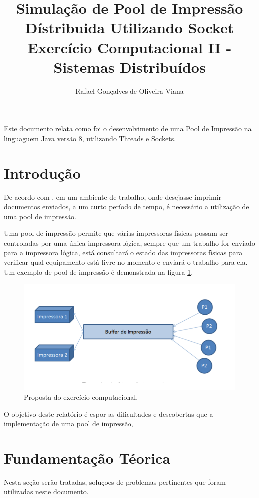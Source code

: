 \documentclass[12pt]{article}
\title{ Simulação de Pool de Impressão Dístribuida Utilizando Socket \\ Exercício Computacional II - Sistemas Distribuídos}
\author{Rafael Gonçalves de Oliveira Viana\inst{1}  }
\begin{document}
 

\maketitle

     
\begin{resumo} 	
  Este  documento relata como foi o desenvolvimento de uma Pool de Impressão na linguaguem Java versão 8, utilizando Threads e Sockets.
\end{resumo}

\section{Introdução}
De acordo com \cite{entf}, em um ambiente de trabalho, onde desejasse imprimir documentos enviados, a um curto período de tempo, é necessário a utilização de uma pool de impressão.

Uma pool de impressão permite que várias impressoras físicas possam ser controladas por uma única impressora lógica,  sempre que um trabalho for enviado para a impressora lógica, está consultará o estado das impressoras físicas para verificar qual equipamento está livre no momento e enviará o trabalho para ela.
 Um exemplo de pool de impressão é demonstrada na figura \ref{fig:screenshot001}.

\begin{figure}[H]
 	\centering
 	\includegraphics[width=0.7\linewidth]{imagens/proposta}
 	\caption{Proposta do exercício computacional.}
 	\label{fig:screenshot001}
 \end{figure}
 
 O objetivo deste relatório é espor as dificultades e descobertas que a implementação de uma pool de impressão, 
\section{Fundamentação Téorica} 
	Nesta seção serão tratadas, soluçoes de problemas pertinentes que foram utilizadas neste documento.
\end{document}
